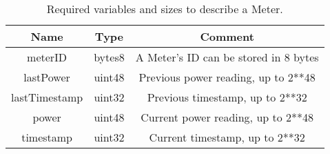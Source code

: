 \begin{table}[htb]
	\centering
	\vspace*{-1ex}
	\scriptsize
	\vspace{-1ex}
	\caption{Required variables and sizes to describe a Meter.}
	\begin{tabular}{|c|c|c|}
        \hline
        \textbf{Name} & \textbf{Type}  & \textbf{Comment}\\ \hline 
        meterID        & bytes8        & A Meter's ID can be stored in 8 bytes\\
        lastPower      & uint48        & Previous power reading, up to 2**48 \\
        lastTimestamp  & uint32        & Previous timestamp, up to 2**32 \\
        power          & uint48        & Current power reading, up to 2**48 \\
        timestamp      & uint32        & Current timestamp, up to 2**32 \\
        \hline
    \end{tabular}
    \label{table:meter}
\end{table}